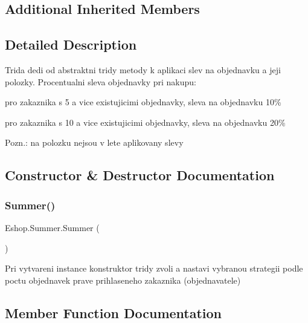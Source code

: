 \subsection*{Additional Inherited Members}


\subsection{Detailed Description}
Trida dedi od abstraktni tridy metody k aplikaci slev na objednavku a jeji polozky. Procentualni sleva objednavky pri nakupu\+: 
\begin{DoxyItemize}
\item pro zakaznika s 5 a vice existujicimi objednavky, sleva na objednavku 10\%  
\item pro zakaznika s 10 a vice existujicimi objednavky, sleva na objednavku 20\%  
\end{DoxyItemize}Pozn.\+: na polozku nejsou v lete aplikovany slevy 



\subsection{Constructor \& Destructor Documentation}
\mbox{\label{class_eshop_1_1_summer_ae45885f55eff0d151906fa6fc8a81fb3}} 
\subsubsection{\texorpdfstring{Summer()}{Summer()}}
{\footnotesize\ttfamily Eshop.\+Summer.\+Summer (\begin{DoxyParamCaption}{ }\end{DoxyParamCaption})}



Pri vytvareni instance konstruktor tridy zvoli a nastavi vybranou strategii podle poctu objednavek prave prihlaseneho zakaznika (objednavatele) 



\subsection{Member Function Documentation}
\mbox{\label{class_eshop_1_1_summer_ae35f16e3f104e0ef827771c32a35a3d6}} 
